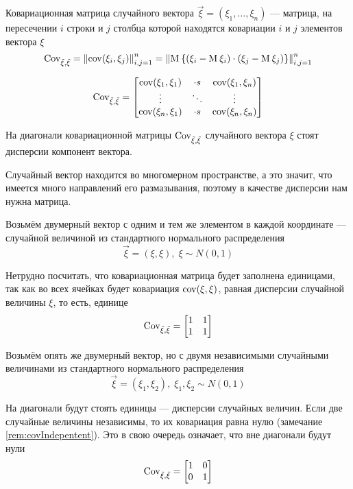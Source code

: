 \begin{definition}
  \label{def:vectorCovMatrix}

  Ковариационная матрица случайного вектора
  $\vec{\xi} = \left( \xi_1, \dots, \xi_n \right)$ --- матрица, на пересечении
  $i$ строки и $j$ столбца которой находятся ковариации $i$ и $j$ элементов
  вектора $\xi$
  $$\operatorname{Cov^{}_{\vec{\xi}, \vec{\xi}}}
      = \left\| \operatorname{cov}\!\left( \xi_i, \xi_j \right) \right\|_{i,j=1}^n
      = \left\| \operatorname{M}_{} 
      \left\{ \left( \xi_i - \operatorname{M}_{} \xi_i \right)
          \cdot \left( \xi_j - \operatorname{M}_{} \xi_j \right)
      \right\} \right\|_{i,j=1}^n$$

  $$\operatorname{Cov^{}_{\vec{\xi}, \vec{\xi}}} =
  \begin{bmatrix}
      \operatorname{cov}\!\left( \xi_1, \xi_1 \right) & \cdot s & \operatorname{cov}\!\left( \xi_1, \xi_n \right) \\
      \vdots & \ddots & \vdots \\
      \operatorname{cov}\!\left( \xi_n, \xi_1 \right) & \cdot s & \operatorname{cov}\!\left( \xi_n, \xi_n \right)
  \end{bmatrix}$$

\end{definition}

\begin{remark}
  На диагонали ковариационной матрицы $\operatorname{Cov^{}_{\vec{\xi}, \vec{\xi}}}$
  случайного вектора $\xi$ стоят дисперсии компонент вектора.
\end{remark}

Случайный вектор находится во многомерном пространстве, а это значит,
что имеется много направлений его размазывания, поэтому в качестве дисперсии
нам нужна матрица.

\begin{example}
  Возьмём двумерный вектор с одним и тем же элементом
  в каждой координате --- случайной величиной из стандартного нормального
  распределения
  $$\vec{\xi} = \left( \xi, \xi \right),\; \xi \sim N\left( 0, 1 \right)$$

  Нетрудно посчитать, что ковариационная матрица будет заполнена единицами,
  так как во всех ячейках будет ковариация $\operatorname{cov}\!\left( \xi, \xi \right)$, равная
  дисперсии случайной величины $\xi$, то есть, единице
  $$\operatorname{Cov^{}_{\vec{\xi}, \vec{\xi}}} =
  \begin{bmatrix}
      1 & 1 \\
      1 & 1
  \end{bmatrix}$$
\end{example}

\begin{example}
  Возьмём опять же двумерный вектор, но с двумя независимыми
  случайными величинами из стандартного нормального распределения
  $$\vec{\xi} = \left( \xi_1, \xi_2 \right),\;
      \xi_1, \xi_2 \sim N\left( 0, 1 \right)$$

  На диагонали будут стоять единицы --- дисперсии случайных величин.
  Если две случайные величины независимы, то их ковариация равна нулю
  (замечание \ref{rem:covIndepentent}).
  Это в свою очередь означает, что вне диагонали
  будут нули
  $$\operatorname{Cov^{}_{\vec{\xi}, \vec{\xi}}} =
  \begin{bmatrix}
      1 & 0 \\
      0 & 1
  \end{bmatrix}$$
\end{example}

